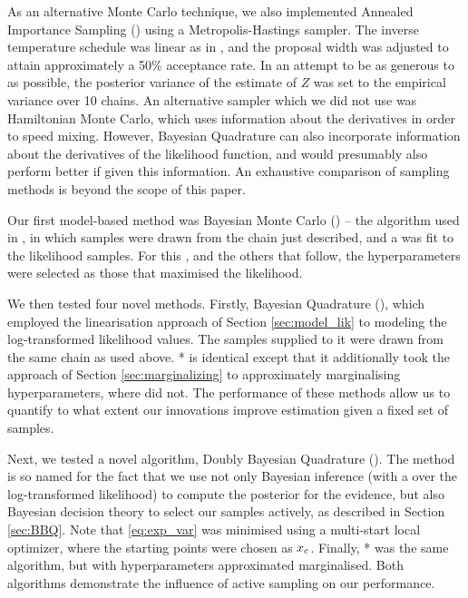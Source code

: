 \documentclass{article}
\begin{document}
As an alternative Monte Carlo technique, we also implemented Annealed Importance Sampling () using a Metropolis-Hastings sampler.  The inverse temperature schedule was linear as in \citep{BZMonteCarlo}, and the proposal width was adjusted to attain approximately a 50\% acceptance rate.  In an attempt to be as generous to  as possible, the posterior variance of the  estimate of $Z$ was set to the empirical variance over 10 chains.  An alternative sampler which we did not use was Hamiltonian Monte Carlo, which uses information about the derivatives in order to speed mixing.  However, Bayesian Quadrature can also incorporate information about the derivatives of the likelihood function, and would presumably also perform better if given this information.  An exhaustive comparison of sampling methods is beyond the scope of this paper.

Our first model-based method was Bayesian Monte Carlo () -- the algorithm used in \citep{BZMonteCarlo}, in which samples were drawn from the  chain just described, and a \gp was fit to the likelihood samples. For this \gp, and the others that follow, the hyperparameters were selected as those that maximised the likelihood. 

We then tested four novel methods. Firstly, Bayesian Quadrature (), which employed the linearisation approach of Section \ref{sec:model_lik} to modeling the log-transformed likelihood values. The samples supplied to it were drawn from the same  chain as used above. * is identical except that it additionally took the approach of Section \ref{sec:marginalizing} to approximately marginalising hyperparameters, where  did not. The performance of these methods allow us to quantify to what extent our innovations improve estimation given a fixed set of samples. 

Next, we tested a novel algorithm, Doubly Bayesian Quadrature (). The method is so named for the fact that we use not only Bayesian inference (with a \gpb over the log-transformed likelihood) to compute the posterior for the evidence, but also Bayesian decision theory to select our samples actively, as described in Section \ref{sec:BBQ}. Note that \eqref{eq:exp_var} was minimised using a multi-start local optimizer, where the starting points were chosen as $\lfv_c$. Finally, * was the same algorithm, but with hyperparameters  approximated marginalised. Both algorithms demonstrate the influence of active sampling on our performance. 
\end{document}
